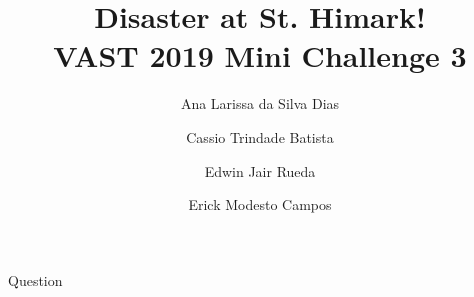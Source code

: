 \documentclass{article}
\author{Ana Larissa da Silva Dias \and Cassio Trindade Batista \and Edwin Jair Rueda \and Erick Modesto Campos}
\title{Disaster at St. Himark!\\VAST 2019 Mini Challenge 3}
\begin{document}
\maketitle



\begin{section}{Question}
\end{section}
\end{document}
